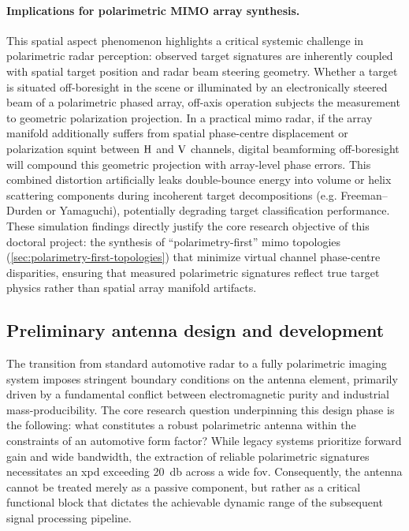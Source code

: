 \paragraph{Implications for polarimetric MIMO array synthesis.}
This spatial aspect phenomenon highlights a critical systemic challenge in polarimetric radar perception: observed target signatures are inherently coupled with spatial target position and radar beam steering geometry.
Whether a target is situated off-boresight in the scene or illuminated by an electronically steered beam of a polarimetric phased array, off-axis operation subjects the measurement to geometric polarization projection.
In a practical \gls{mimo} radar, if the array manifold additionally suffers from spatial phase-centre displacement or polarization squint between $\mathrm{H}$ and $\mathrm{V}$ channels, digital beamforming off-boresight will compound this geometric projection with array-level phase errors.
This combined distortion artificially leaks double-bounce energy into volume or helix scattering components during incoherent target decompositions (e.g. Freeman--Durden or Yamaguchi), potentially degrading target classification performance.
These simulation findings directly justify the core research objective of this doctoral project: the synthesis of \enquote{polarimetry-first} \gls{mimo} topologies (\cref{sec:polarimetry-first-topologies}) that minimize virtual channel phase-centre disparities, ensuring that measured polarimetric signatures reflect true target physics rather than spatial array manifold artifacts.


\subsection{Preliminary antenna design and development}
\label{sec:preliminary-antenna-design}

The transition from standard automotive radar to a fully polarimetric imaging system imposes stringent boundary conditions on the antenna element, primarily driven by a fundamental conflict between electromagnetic purity and industrial mass-producibility.
The core research question underpinning this design phase is the following: what constitutes a robust polarimetric antenna within the constraints of an automotive form factor?
While legacy systems prioritize forward gain and wide bandwidth, the extraction of reliable polarimetric signatures necessitates an \gls{xpd} exceeding \qty{20}{\decibel} across a wide \gls{fov}.
Consequently, the antenna cannot be treated merely as a passive component, but rather as a critical functional block that dictates the achievable dynamic range of the subsequent signal processing pipeline.

